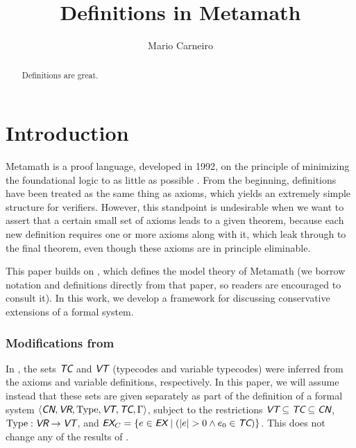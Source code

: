 \documentclass[runningheads,a4paper]{llncs}
\newcommand{\cn}{\textit{\textsf{CN}}} %
\newcommand{\vr}{\textit{\textsf{VR}}} %
\newcommand{\ex}{\textit{\textsf{EX}}} %
\newcommand{\ec}{\textit{\textsf{EX}}_C} %
\newcommand{\tc}{\textit{\textsf{TC}}} %
\newcommand{\vt}{\textit{\textsf{VT}}} %
\newcommand{\ang}[1]{\langle#1\rangle}
\newcommand{\type}{{\rm Type}}
\begin{document}
\mainmatter  %

\title{Definitions in Metamath}


\author{Mario Carneiro}
%


\maketitle


\begin{abstract}
Definitions are great.
\end{abstract}


\section{Introduction}\label{sec:intro}

Metamath is a proof language, developed in 1992, on the principle of minimizing the foundational logic to as little as possible \cite{metamath}. From the beginning, definitions have been treated as the same thing as axioms, which yields an extremely simple structure for verifiers. However, this standpoint is undesirable when we want to assert that a certain small set of axioms leads to a given theorem, because each new definition requires one or more axioms along with it, which leak through to the final theorem, even though these axioms are in principle eliminable.

This paper builds on \cite{models}, which defines the model theory of Metamath (we borrow notation and definitions directly from that paper, so readers are encouraged to consult it). In this work, we develop a framework for discussing conservative extensions of a formal system.

\subsubsection{Modifications from \cite{models}}
In \cite{models}, the sets $\tc$ and $\vt$ (typecodes and variable typecodes) were inferred from the axioms and variable definitions, respectively. In this paper, we will assume instead that these sets are given separately as part of the definition of a formal system $\ang{\cn,\vr,\type,\vt,\tc,\Gamma}$, subject to the restrictions $\vt\subseteq\tc\subseteq\cn$, $\type:\vr\to\vt$, and $\ec=\{e\in\ex\mid(|e|>0 \wedge e_0\in\tc)\}$. This does not change any of the results of \cite{models}.
\end{document}
